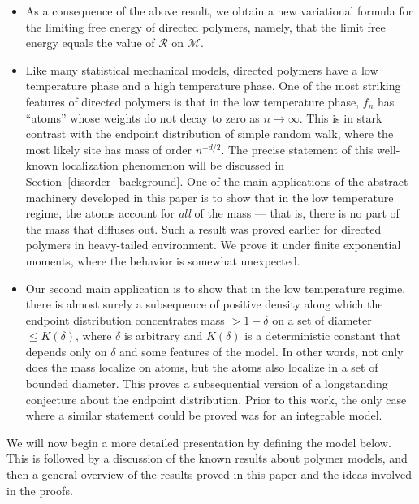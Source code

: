 \documentclass[11pt,reqno]{amsart}
\numberwithin{equation}{section}
\theoremstyle{definition}
\begin{document}
\begin{itemize}
\item As a consequence of the above result, we obtain a new variational formula for the limiting free energy of directed polymers, namely, that the limit free energy equals the value of ${\mathcal{R}}$ on ${\mathcal{M}}$. 
\item Like many statistical mechanical models, directed polymers have a low temperature phase and a high temperature phase. One of the most striking features of directed polymers is that in the low temperature phase, $f_n$ has ``atoms'' whose weights do not decay to zero as $n\to \infty$. This is in stark contrast with the endpoint distribution of simple random walk, where the most likely site has mass of order $n^{-d/2}$. The precise statement of this well-known localization phenomenon will be discussed in Section~\ref{disorder_background}. One of the main applications of the abstract machinery developed in this paper is to show that in the low temperature regime, the atoms account for {\it all} of the mass --- that is, there is no part of the mass that diffuses out. Such a result was proved earlier for directed polymers in heavy-tailed environment. We prove it under finite exponential moments, where the behavior is somewhat unexpected.
\item Our second main application is to show that in the low temperature regime, there is almost surely a subsequence of positive density along which the endpoint distribution concentrates mass $> 1-\delta$ on a set of diameter $\leq K(\delta)$, where $\delta$ is arbitrary and $K(\delta)$ is a deterministic constant that depends only on $\delta$ and some features of the model. In other words, not only does the mass localize on atoms, but the atoms also localize in a set of bounded diameter. This proves a subsequential version of a longstanding conjecture about the endpoint distribution. Prior to this work, the only case where a similar statement could be proved was for an integrable model.
\end{itemize}
We will now begin a more detailed presentation by defining the model below. This is followed by a discussion of the known results about polymer models, and then a general overview of the results proved in this paper and the ideas involved in the proofs. 
\end{document}
